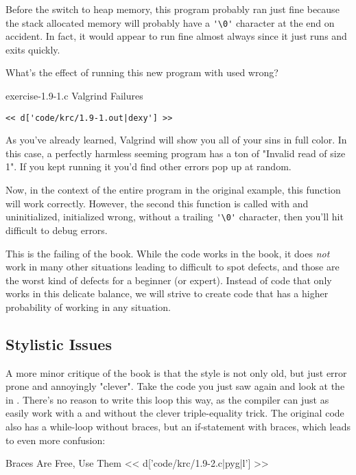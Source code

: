 Before the switch to heap memory, this program probably ran just fine
because the stack allocated memory will probably have a \verb|'\0'| character
at the end on accident.  In fact, it would appear to run fine almost always
since it just runs and exits quickly.

What's the effect of running this new program with  used wrong?

\begin{code}{exercise-1.9-1.c Valgrind Failures}
\begin{lstlisting}
<< d['code/krc/1.9-1.out|dexy'] >>
\end{lstlisting}
\end{code}

As you've already learned, Valgrind will show you all of your sins in full
color.  In this case, a perfectly harmless seeming program has a ton of
"Invalid read of size 1".  If you kept running it you'd find other errors pop
up at random.

Now, in the context of the entire program in the original \krc example, this function
will work correctly.  However, the second this function is called with
 and  uninitialized, initialized wrong, 
without a trailing \verb|'\0'| character, then you'll hit difficult to debug
errors.

This is the failing of the book.  While the code works in the book, it does
\emph{not} work in many other situations leading to difficult to spot defects,
and those are the worst kind of defects for a beginner (or expert).
Instead of code that only works in this delicate balance, we will strive to
create code that has a higher probability of working in any situation.


\subsection{Stylistic Issues}

A more minor critique of the book is that the style is not only old, but just
error prone and annoyingly "clever".  Take the code you just saw again and look
at the  in .  There's no reason to write this
loop this way, as the compiler can just as easily work with a 
and without the clever triple-equality trick.  The original code also
has a while-loop without braces, but an if-statement with braces, which
leads to even more confusion:

\begin{code}{Braces Are Free, Use Them}
<< d['code/krc/1.9-2.c|pyg|l'] >>
\end{code}

